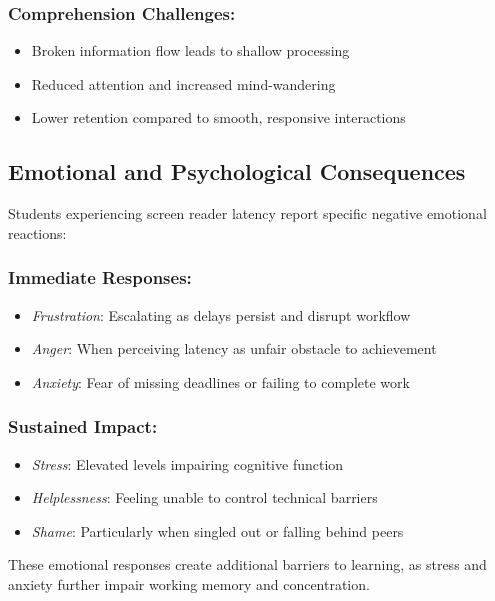 \subsubsection{Comprehension Challenges:}

\begin{itemize}
\item Broken information flow leads to shallow processing
\item Reduced attention and increased mind-wandering
\item Lower retention compared to smooth, responsive interactions
\end{itemize}

\subsection{Emotional and Psychological Consequences}\label{emotional-and-psychological-consequences}

Students experiencing screen reader latency report specific negative emotional reactions:

\subsubsection{Immediate Responses:}

\begin{itemize}
\item \emph{Frustration}: Escalating as delays persist and disrupt workflow
\item \emph{Anger}: When perceiving latency as unfair obstacle to achievement
\item \emph{Anxiety}: Fear of missing deadlines or failing to complete work
\end{itemize}

\subsubsection{Sustained Impact:}

\begin{itemize}
\item \emph{Stress}: Elevated levels impairing cognitive function
\item \emph{Helplessness}: Feeling unable to control technical barriers
\item \emph{Shame}: Particularly when singled out or falling behind peers
\end{itemize}

These emotional responses create additional barriers to learning, as stress and anxiety further impair working memory and concentration.

